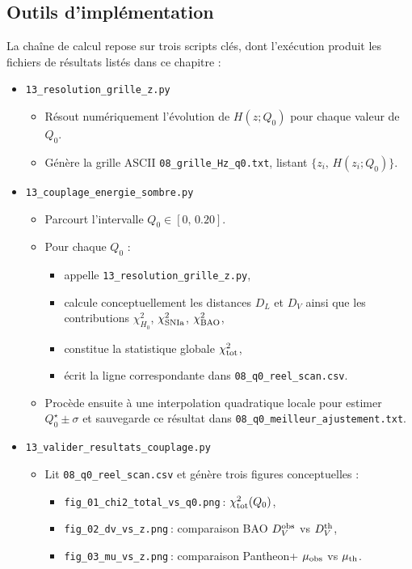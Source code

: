 \subsection{Outils d’implémentation}

La chaîne de calcul repose sur trois scripts clés, dont l’exécution produit les fichiers de résultats listés dans ce chapitre :

\begin{itemize}
  \item \texttt{13\_resolution\_grille\_z.py}
    \begin{itemize}
      \item Résout numériquement l’évolution de \(H(z;Q_{0})\) pour chaque valeur de \(Q_{0}\).
      \item Génère la grille ASCII \texttt{08\_grille\_Hz\_q0.txt}, listant \(\{z_{i},\,H(z_{i};Q_{0})\}\).
    \end{itemize}

  \item \texttt{13\_couplage\_energie\_sombre.py}
    \begin{itemize}
      \item Parcourt l’intervalle \(Q_{0}\in[0,\,0.20]\).
      \item Pour chaque \(Q_{0}\) :
        \begin{itemize}
          \item appelle \texttt{13\_resolution\_grille\_z.py},
          \item calcule conceptuellement les distances \(D_{L}\) et \(D_{V}\) ainsi que les contributions \(\chi^{2}_{H_{0}}\), \(\chi^{2}_{\rm SNIa}\), \(\chi^{2}_{\rm BAO}\),
          \item constitue la statistique globale \(\chi^{2}_{\rm tot}\),
          \item écrit la ligne correspondante dans \texttt{08\_q0\_reel\_scan.csv}.
        \end{itemize}
      \item Procède ensuite à une interpolation quadratique locale pour estimer
        \(Q_{0}^{\star}\pm\sigma\) et sauvegarde ce résultat dans
        \texttt{08\_q0\_meilleur\_ajustement.txt}.
    \end{itemize}

  \item \texttt{13\_valider\_resultats\_couplage.py}
    \begin{itemize}
      \item Lit \texttt{08\_q0\_reel\_scan.csv} et génère trois figures conceptuelles :
        \begin{itemize}
          \item \texttt{fig\_01\_chi2\_total\_vs\_q0.png} : \(\chi^{2}_{\rm tot}(Q_{0})\),
          \item \texttt{fig\_02\_dv\_vs\_z.png} : comparaison BAO \(D_{V}^{\rm obs}\) vs \(D_{V}^{\rm th}\),
          \item \texttt{fig\_03\_mu\_vs\_z.png} : comparaison Pantheon+ \(\mu_{\rm obs}\) vs \(\mu_{\rm th}\).
        \end{itemize}
    \end{itemize}
\end{itemize}

